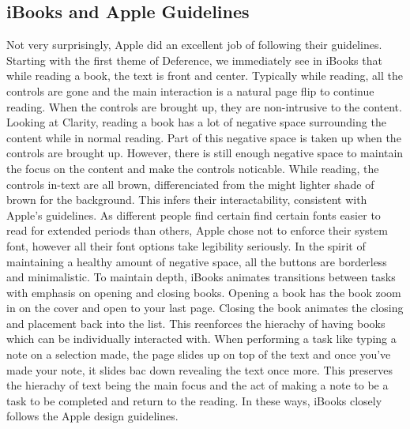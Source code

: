 \documentclass[journal,letterpaper]{article}
\begin{document}
    \subsection{iBooks and Apple Guidelines}
    Not very surprisingly, Apple did an excellent job of following their guidelines. Starting with the first theme of Deference, we immediately see in iBooks that while reading a book, the text is front and center. Typically while reading, all the controls are gone and the main interaction is a natural page flip to continue reading. When the controls are brought up, they are non-intrusive to the content. Looking at Clarity, reading a book has a lot of negative space surrounding the content while in normal reading. Part of this negative space is taken up when the controls are brought up. However, there is still enough negative space to maintain the focus on the content and make the controls noticable. While reading, the controls in-text are all brown, differenciated from the might lighter shade of brown for the background. This infers their interactability, consistent with Apple's guidelines. As different people find certain find certain fonts easier to read for extended periods than others, Apple chose not to enforce their system font, however all their font options take legibility seriously. In the spirit of maintaining a healthy amount of negative space, all the buttons are borderless and minimalistic. To maintain depth, iBooks animates transitions between tasks with emphasis on opening and closing books. Opening a book has the book zoom in on the cover and open to your last page. Closing the book animates the closing and placement back into the list. This reenforces the hierachy of having books which can be individually interacted with. When performing a task like typing a note on a selection made, the page slides up on top of the text and once you've made your note, it slides bac down revealing the text once more. This preserves the hierachy of text being the main focus and the act of making a note to be a task to be completed and return to the reading. In these ways, iBooks closely follows the Apple design guidelines. 
\end{document}
